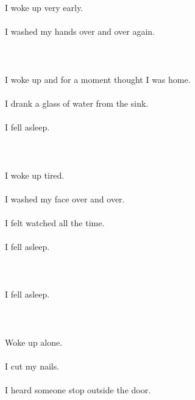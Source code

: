 \documentclass{article}
\begin{document}
    
    \section{}
    I woke up very early.\\\\I washed my hands over and over again.\\\\ 
    \newpage
    
    \section{}
    I woke up and for a moment thought I was home.\\\\I drank a glass of water from the sink.\\\\I fell asleep.\\\\ 
    \newpage
    
    \section{}
    I woke up tired.\\\\I washed my face over and over.\\\\I felt watched all the time.\\\\I fell asleep.\\\\ 
    \newpage
    
    \section{}
    I fell asleep.\\\\ 
    \newpage
    
    \section{}
    Woke up alone.\\\\I cut my nails.\\\\I heard someone stop outside the door.\\\\ 
    \newpage
    
\end{document}
